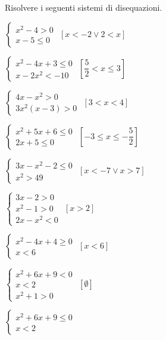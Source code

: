 \begin{esercizio}[\Ast]
 \label{ese:4.75}
Risolvere i seguenti sistemi di disequazioni.
\begin{multicols}{2}
\begin{enumeratea}
\item \(\left\{\begin{array}{l}x^2-4>0\\x-5\le 0\end{array}\right.\) 
 \hfill \(\left[x<-2\vee 2<x\right]\)
\item \(\left\{\begin{array}{l}x^2-4x+3\le 0\\x-2x^2<-10\end{array}\right.\)
 \hfill \(\left[\dfrac 5 2<x\le 3\right]\)
\item \(\left\{\begin{array}{l}4x-x^2>0\\3x^2(x-3)>0\end{array}\right.\)
 \hfill \(\left[3<x<4\right]\)
\item \(\left\{\begin{array}{l}x^2+5x+6\le 0\\2x+5\le 0\end{array}\right.\)
 \hfill \(\left[-3\le x\le -\dfrac 5 2\right]\)
\item \(\left\{\begin{array}{l}3x-x^2-2\le 0\\x^2>49\end{array}\right.\)
 \hfill \(\left[x<-7\vee x>7\right]\)
\item \(\left\{\begin{array}{l}3x-2>0\\x^2-1>0\\2x-x^2<0\end{array}\right.\)
 \hfill \(\left[x>2\right]\)
\item \(\left\{\begin{array}{l}x^2-4x+4\ge 0\\x<6\end{array}\right.\)
 \hfill \(\left[x<6\right]\)
\item \(\left\{\begin{array}{l}x^2+6x+9<0\\x<2\\x^2+1>0\end{array}\right.\)
 \hfill \(\left[\emptyset\right]\)
\item \(\left\{\begin{array}{l}x^2+6x+9\le 0\\x<2\end{array}\right.\)

\end{enumeratea}
\end{multicols}
\end{esercizio}
